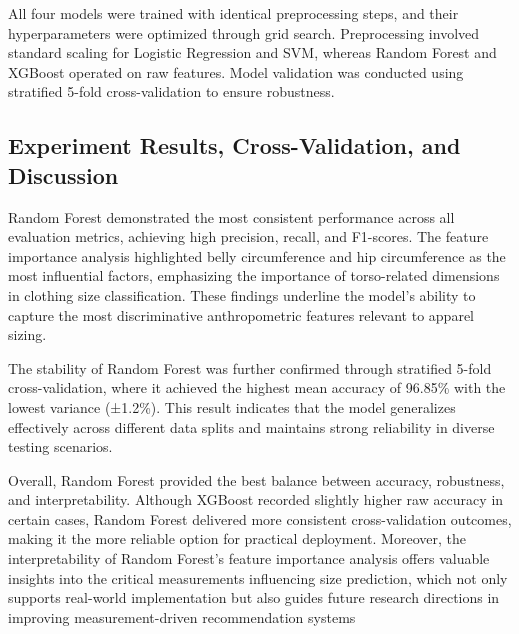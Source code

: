 \documentclass{llncs}
\begin{document}
All four models were trained with identical preprocessing steps, and their hyperparameters were optimized through grid search. 
Preprocessing involved standard scaling for Logistic Regression and SVM, whereas Random Forest and XGBoost operated on raw features. 
Model validation was conducted using stratified 5-fold cross-validation to ensure robustness.

\subsection{Experiment Results, Cross-Validation, and Discussion}

Random Forest demonstrated the most consistent performance across all evaluation metrics, achieving high precision, recall, and F1-scores. 
The feature importance analysis highlighted belly circumference and hip circumference as the most influential factors, emphasizing the importance of torso-related dimensions in clothing size classification. 
These findings underline the model’s ability to capture the most discriminative anthropometric features relevant to apparel sizing.

The stability of Random Forest was further confirmed through stratified 5-fold cross-validation, where it achieved the highest mean accuracy of 96.85\% with the lowest variance (±1.2\%). 
This result indicates that the model generalizes effectively across different data splits and maintains strong reliability in diverse testing scenarios.

Overall, Random Forest provided the best balance between accuracy, robustness, and interpretability. 
Although XGBoost recorded slightly higher raw accuracy in certain cases, Random Forest delivered more consistent cross-validation outcomes, making it the more reliable option for practical deployment. 
Moreover, the interpretability of Random Forest’s feature importance analysis offers valuable insights into the critical measurements influencing size prediction, 
    which not only supports real-world implementation but also guides future research directions in improving measurement-driven recommendation systems
\end{document}
